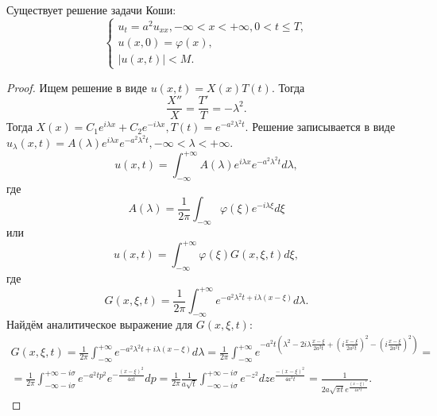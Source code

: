 \documentclass[11pt]{article}
\newcounter{th}\setcounter{th}{0}
\def\th{\par\smallskip\refstepcounter{th}\textbf{\arabic{th}}}
\newtheorem*{Theorem}{Теорема \th}
\begin{document}
\begin{Theorem}
Существует решение задачи Коши:
\begin{equation}
\begin{cases}
u_t = a^2u_{xx}, -\infty < x < +\infty, 0 < t \leq T, \\
u(x, 0) = \varphi(x), \\
|u(x, t)| < M.
\end{cases}
\end{equation}
\begin{proof}
Ищем решение в виде $u(x, t) = X(x)T(t)$. Тогда
\begin{equation}
\frac{X''}X = \frac{T'}T = -\lambda^2.
\end{equation}
Тогда $X(x) = C_1e^{i\lambda x} + C_2e^{-i\lambda x}, T(t) = e^{-a^2\lambda^2t}$. Решение записывается
в виде $u_{\lambda}(x, t) = A(\lambda)e^{i\lambda x}e^{-a^2\lambda^2t}, -\infty < \lambda < +\infty$.
\begin{equation}
u(x, t) = \int_{-\infty}^{+\infty}A(\lambda)e^{i\lambda x}e^{-a^2\lambda^2t}d\lambda,
\end{equation}
где
\begin{equation}
A(\lambda) = \frac{1}{2\pi}\int_{-\infty}\varphi(\xi)e^{-i\lambda\xi}d\xi
\end{equation}
или
\begin{equation}
u(x, t) = \int_{-\infty}^{+\infty}\varphi(\xi)G(x, \xi, t)d\xi,
\end{equation}
где
\begin{equation}
G(x, \xi, t) = \frac1{2\pi}\int_{-\infty}^{+\infty}e^{-a^2\lambda^2t + i\lambda(x - \xi)}d\lambda.
\end{equation}
Найдём аналитическое выражение для $G(x, \xi, t)$:
\begin{multline}
G(x, \xi, t) = \frac1{2\pi}\int_{-\infty}^{+\infty}e^{-a^2\lambda^2t + i\lambda(x - \xi)}d\lambda =
\frac1{2\pi}\int_{-\infty}^{+\infty}e^{-a^2t\left(\lambda^2 - 2i\lambda\frac{x - \xi}{2a^2t} + \left(i\frac{x - \xi}{2a^2t}\right)^2 - \left(i\frac{x - \xi}{2a^2t}\right)^2\right)} = \\
= \frac1{2\pi}\int_{-\infty - i\sigma}^{+\infty - i\sigma}e^{-a^2tp^2}e^{-\frac{(x - \xi)^2}{4at}}dp
= \frac1{2\pi}\frac1{a\sqrt{t}}\int_{-\infty - i\sigma}^{+\infty - i\sigma}e^{-z^2}dze^{\frac{-(x - \xi)^2}{4a^2t}} = \frac1{2a\sqrt{\pi t}e^{\frac{(x - \xi)^2}{4a^2t}}}.
\end{multline}
\end{proof}
\end{Theorem}
\end{document}
